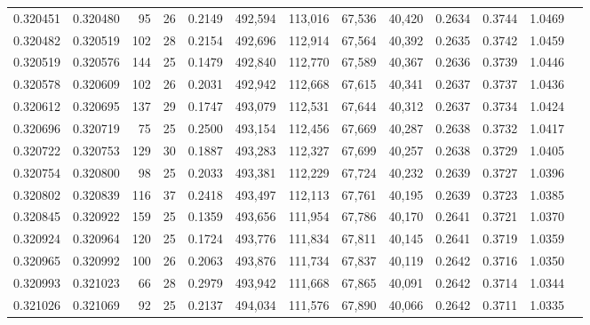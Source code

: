 \begin{tabular}{rrrrrrrrrrrrr}
0.320451 & 0.320480 &    95 &  26 &                                     0.2149 & 492,594 & 113,016 &  67,536 &  40,420 & 0.2634 & 0.3744 & 1.0469 \\
0.320482 & 0.320519 &   102 &  28 &                                     0.2154 & 492,696 & 112,914 &  67,564 &  40,392 & 0.2635 & 0.3742 & 1.0459 \\
0.320519 & 0.320576 &   144 &  25 &                                     0.1479 & 492,840 & 112,770 &  67,589 &  40,367 & 0.2636 & 0.3739 & 1.0446 \\
0.320578 & 0.320609 &   102 &  26 &                                     0.2031 & 492,942 & 112,668 &  67,615 &  40,341 & 0.2637 & 0.3737 & 1.0436 \\
0.320612 & 0.320695 &   137 &  29 &                                     0.1747 & 493,079 & 112,531 &  67,644 &  40,312 & 0.2637 & 0.3734 & 1.0424 \\
0.320696 & 0.320719 &    75 &  25 &                                     0.2500 & 493,154 & 112,456 &  67,669 &  40,287 & 0.2638 & 0.3732 & 1.0417 \\
0.320722 & 0.320753 &   129 &  30 &                                     0.1887 & 493,283 & 112,327 &  67,699 &  40,257 & 0.2638 & 0.3729 & 1.0405 \\
0.320754 & 0.320800 &    98 &  25 &                                     0.2033 & 493,381 & 112,229 &  67,724 &  40,232 & 0.2639 & 0.3727 & 1.0396 \\
0.320802 & 0.320839 &   116 &  37 &                                     0.2418 & 493,497 & 112,113 &  67,761 &  40,195 & 0.2639 & 0.3723 & 1.0385 \\
0.320845 & 0.320922 &   159 &  25 &                                     0.1359 & 493,656 & 111,954 &  67,786 &  40,170 & 0.2641 & 0.3721 & 1.0370 \\
0.320924 & 0.320964 &   120 &  25 &                                     0.1724 & 493,776 & 111,834 &  67,811 &  40,145 & 0.2641 & 0.3719 & 1.0359 \\
0.320965 & 0.320992 &   100 &  26 &                                     0.2063 & 493,876 & 111,734 &  67,837 &  40,119 & 0.2642 & 0.3716 & 1.0350 \\
0.320993 & 0.321023 &    66 &  28 &                                     0.2979 & 493,942 & 111,668 &  67,865 &  40,091 & 0.2642 & 0.3714 & 1.0344 \\
0.321026 & 0.321069 &    92 &  25 &                                     0.2137 & 494,034 & 111,576 &  67,890 &  40,066 & 0.2642 & 0.3711 & 1.0335 \\

\end{tabular}
